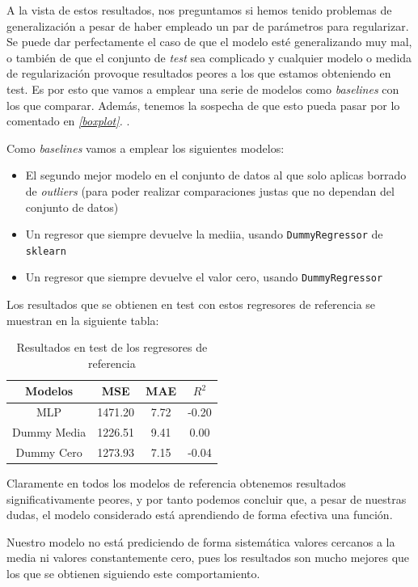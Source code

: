 \documentclass[11pt]{article}
\begin{document}
A la vista de estos resultados, nos preguntamos si hemos tenido problemas de generalización a pesar de haber empleado un par de parámetros para regularizar. Se puede dar perfectamente el caso de que el modelo esté generalizando muy mal, o también de que el conjunto de \emph{test} sea complicado y cualquier modelo o medida de regularización provoque resultados peores a los que estamos obteniendo en test. Es por esto que vamos a emplear una serie de modelos como \emph{baselines} con los que comparar. Además, tenemos la sospecha de que esto pueda pasar por lo comentado en \emph{\ref{boxplot}. }.

Como \emph{baselines} vamos a emplear los siguientes modelos:

\begin{itemize}
    \item El segundo mejor modelo en el conjunto de datos al que solo aplicas borrado de \emph{outliers} (para poder realizar comparaciones justas que no dependan del conjunto de datos)
    \item Un regresor que siempre devuelve la mediia, usando \lstinline{DummyRegressor} de \lstinline{sklearn}
    \item Un regresor que siempre devuelve el valor cero, usando \lstinline{DummyRegressor}
\end{itemize}

Los resultados que se obtienen en test con estos regresores de referencia se muestran en la siguiente tabla:

\begin{table}[H]
  \centering
  \begin{tabular}{|c|c|c|c|}
  \hline
  \textbf{Modelos}  & \textbf{MSE} & \textbf{MAE} & \textbf{$R^2$} \\
  \hline
  MLP  & 1471.20  &  7.72 & -0.20 \\
  Dummy Media   & 1226.51 & 9.41 & 0.00 \\
  Dummy Cero & 1273.93 & 7.15 & -0.04 \\
  \hline
  \end{tabular}
  \caption{Resultados en test de los regresores de referencia}
\end{table}

Claramente en todos los modelos de referencia obtenemos resultados significativamente peores, y por tanto podemos concluir que, a pesar de nuestras dudas, el modelo considerado está aprendiendo de forma efectiva una función.

Nuestro modelo no está prediciendo de forma sistemática valores cercanos a la media ni valores constantemente cero, pues los resultados son mucho mejores que los que se obtienen siguiendo este comportamiento.
\end{document}
